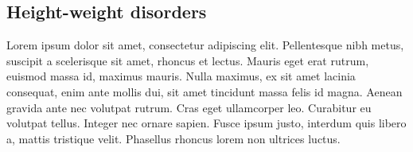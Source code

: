 \subsection{Height-weight disorders}\label{sub:heightweightdisorders}
Lorem ipsum dolor sit amet, consectetur adipiscing elit. Pellentesque nibh metus, suscipit a scelerisque sit amet, rhoncus et lectus. Mauris eget erat rutrum, euismod massa id, maximus mauris. Nulla maximus, ex sit amet lacinia consequat, enim ante mollis dui, sit amet tincidunt massa felis id magna. Aenean gravida ante nec volutpat rutrum. Cras eget ullamcorper leo. Curabitur eu volutpat tellus. Integer nec ornare sapien. Fusce ipsum justo, interdum quis libero a, mattis tristique velit. Phasellus rhoncus lorem non ultrices luctus.

